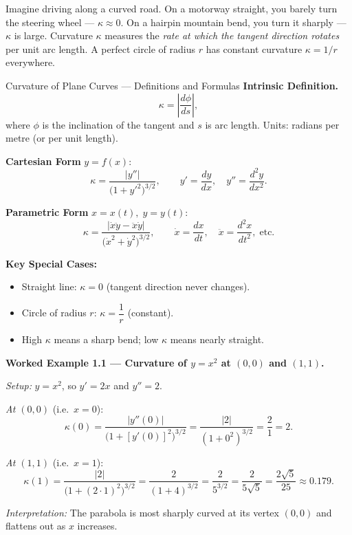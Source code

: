 \documentclass[12pt,a4paper]{article}
\begin{document}
Imagine driving along a curved road. On a motorway straight, you barely turn the steering wheel --- $\kappa \approx 0$. On a hairpin mountain bend, you turn it sharply --- $\kappa$ is large. Curvature $\kappa$ measures the \emph{rate at which the tangent direction rotates} per unit arc length. A perfect circle of radius $r$ has constant curvature $\kappa = 1/r$ everywhere.

\begin{infobox}{Curvature of Plane Curves --- Definitions and Formulas}
\textbf{Intrinsic Definition.}
\[
  \kappa = \left|\frac{d\phi}{ds}\right|,
\]
where $\phi$ is the inclination of the tangent and $s$ is arc length. Units: radians per metre (or per unit length).

\medskip
\textbf{Cartesian Form} $y = f(x)$:
\[
  \kappa = \frac{|y''|}{\bigl(1 + y'^{2}\bigr)^{3/2}}, \qquad y' = \frac{dy}{dx},\quad y'' = \frac{d^{2}y}{dx^{2}}.
\]

\textbf{Parametric Form} $x = x(t),\; y = y(t)$:
\[
  \kappa = \frac{|\dot{x}\ddot{y} - \ddot{x}\dot{y}|}{\bigl(\dot{x}^{2}+\dot{y}^{2}\bigr)^{3/2}}, \qquad \dot{x} = \frac{dx}{dt},\quad \ddot{x} = \frac{d^{2}x}{dt^{2}},\; \text{etc.}
\]

\textbf{Key Special Cases:}
\begin{itemize}[nosep]
  \item Straight line: $\kappa = 0$ (tangent direction never changes).
  \item Circle of radius $r$: $\kappa = \dfrac{1}{r}$ (constant).
  \item High $\kappa$ means a sharp bend; low $\kappa$ means nearly straight.
\end{itemize}
\end{infobox}

\textbf{Worked Example 1.1 --- Curvature of $y = x^2$ at $(0,0)$ and $(1,1)$.}

\medskip
\textit{Setup:} $y = x^2$, so $y' = 2x$ and $y'' = 2$.

\medskip
\textit{At $(0, 0)$} (i.e.\ $x = 0$):
\[
  \kappa(0) = \frac{|y''(0)|}{\bigl(1 + [y'(0)]^{2}\bigr)^{3/2}} = \frac{|2|}{(1 + 0^{2})^{3/2}} = \frac{2}{1} = 2.
\]

\textit{At $(1, 1)$} (i.e.\ $x = 1$):
\[
  \kappa(1) = \frac{|2|}{\bigl(1 + (2\cdot 1)^{2}\bigr)^{3/2}} = \frac{2}{(1 + 4)^{3/2}} = \frac{2}{5^{3/2}} = \frac{2}{5\sqrt{5}} = \frac{2\sqrt{5}}{25} \approx 0.179.
\]

\textit{Interpretation:} The parabola is most sharply curved at its vertex $(0,0)$ and flattens out as $x$ increases.
\end{document}
